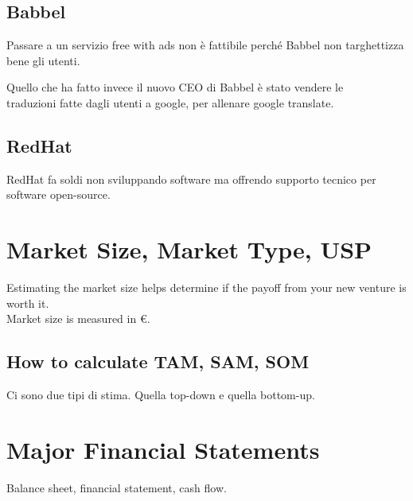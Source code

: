 \documentclass{article}
\begin{document}
\subsection{Babbel}
Passare a un servizio free with ads non è fattibile perché Babbel non targhettizza bene gli utenti.

Quello che ha fatto invece il nuovo CEO di Babbel è stato vendere le\\ traduzioni fatte dagli utenti a google, per allenare google translate.

\subsection{RedHat}
RedHat fa soldi non sviluppando software ma offrendo supporto tecnico per software open-source.

\section{Market Size, Market Type, USP}
Estimating the market size helps determine if the payoff from your new venture is worth it. \\
Market size is measured in €.

\subsection{How to calculate TAM, SAM, SOM}
Ci sono due tipi di stima. Quella top-down e quella bottom-up.

\section{Major Financial Statements}
Balance sheet, financial statement, cash flow.
\end{document}
